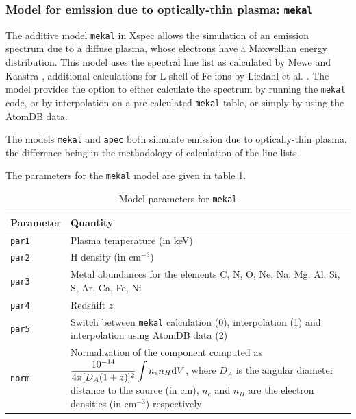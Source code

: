			\subsubsection{Model for emission due to optically-thin plasma: \texttt{mekal}}
				The additive model \texttt{mekal} in Xspec allows the simulation of an emission spectrum due to a diffuse plasma, whose electrons have a Maxwellian energy distribution. This model uses the spectral line list as calculated by Mewe and Kaastra \cite{meka}, additional calculations for L-shell of Fe ions by Liedahl et al. \cite{liedahl}. The model provides the option to either calculate the spectrum by running the \texttt{mekal} code, or by interpolation on a pre-calculated \texttt{mekal} table, or simply by using the AtomDB data.
				
				The models \texttt{mekal} and \texttt{apec} both simulate emission due to optically-thin plasma, the difference being in the methodology of calculation of the line lists.
				
				The parameters for the \texttt{mekal} model are given in table \ref{param:mekal}.
				\begin{table}[h!]
					\centering
					\caption{Model parameters for \texttt{mekal}}
					\label{param:mekal}
					\begin{tabular}{p{}p{}}
						\hline
						\textbf{Parameter} & \textbf{Quantity} \\ \hline
						{\texttt{par1}} & {Plasma temperature (in keV)} \\ %
						{\texttt{par2}} & {H density (in cm$^{-3}$)} \\ %
						{\texttt{par3}} & {Metal abundances for the elements C, N, O, Ne, Na, Mg, Al, Si, S, Ar, Ca, Fe, Ni} \\ %
						{\texttt{par4}} & {Redshift $z$} \\ %
						{\texttt{par5}} & {Switch between \texttt{mekal} calculation (0), interpolation (1) and interpolation using AtomDB data (2)} \\ %
						{\texttt{norm}} & {Normalization of the component computed as $\displaystyle\dfrac{10^{-14}}{4\pi[D_A(1+z)]^2}\int{n_en_H\mathrm{d}V}$, where $D_A$ is the angular diameter distance to the source (in cm), $n_e$ and $n_H$ are the electron densities (in cm$^{-3}$) respectively} \\ \hline
					\end{tabular}
				\end{table}
			
